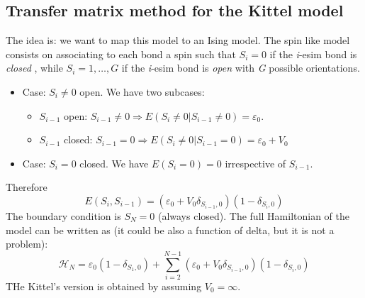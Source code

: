 \documentclass[../main/main.tex]{subfiles}
\begin{document}
\subsection{Transfer matrix method for the Kittel model}
The idea is: we want to map this model to an Ising model. The spin like model consists on associating to each bond a spin such that \( S_i = 0 \) if the \emph{i}-esim bond is \emph{closed} , while \( S_i = 1, \dots, G \) if the \emph{i}-esim bond is \emph{open} with \emph{G} possible orientations.
\begin{itemize}
  \item Case: \( S_i \neq 0 \) open. We have two subcases:
  \begin{itemize}
  \item \( S_{i-1}\) open: \( S_{i-1} \neq 0 \Rightarrow E (S_i \neq 0 | S_{i-1} \neq 0) = \varepsilon _0\).
  \item \( S_{i-1}\) closed: \( S_{i-1} = 0 \Rightarrow  E (S_i \neq 0 | S_{i-1} = 0) = \varepsilon _0 + V_0 \)
  \end{itemize}
\item Case: \( S_i = 0 \) closed. We have \( E (S_i=0)=0 \) irrespective of \( S_{i-1} \).
\end{itemize}
Therefore
\begin{equation}
  E ( S_i, S_{i-1}) = ( \varepsilon _0 + V_0 \delta _{S_{i-1},0}) (1- \delta _{S_i,0})
\end{equation}
The boundary condition is \( S_N =0 \) (always closed).
The full Hamiltonian of the model can be written as (it could be also a function of delta, but it is not a problem):
\begin{equation}
  \mathcal{H}_N = \varepsilon _0 (1- \delta _{S_1,0}) + \sum_{i=2}^{N-1} (\varepsilon _0 + V_0 \delta _{S_{i-1},0})(1- \delta _{S_i,0})
\end{equation}
THe Kittel's version is obtained by assuming \( V_0 = \infty  \).
\end{document}
